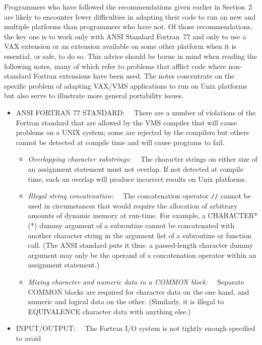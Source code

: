 \documentclass[twoside,11pt]{article}
\renewcommand{\_}{{\tt\char'137}}
\begin{document}
Programmers who have followed the recommendations given earlier in
Section~2 are likely to encounter fewer difficulties in adapting their
code to run on new and multiple platforms than programmers who have
not.  Of those recommendations, the key one is to work only with
ANSI Standard Fortran~77 and only to use a VAX extension
or an extension available on some other platform when it is essential,
or safe, to do so.  This advice
should be borne in mind when reading the following
notes, many of which refer to problems that
afflict code where non-standard Fortran extensions have
been used.  The notes concentrate on the specific problem of adapting
VAX/VMS applications to run on Unix platforms but also serve to
illustrate more general portability issues.
\begin{itemize}
 \item ANSI FORTRAN 77 STANDARD:~~
  There are a number of violations of the Fortran standard that are
  allowed by the VMS compiler that will cause problems on a UNIX system;
  some are rejected by the compilers but others cannot be detected at
  compile time and will cause programs to fail.
  \begin{itemize}
   \item {\it Overlapping character substrings:~~}
    The character strings on either size of an assignment
    statement must not overlap.  If not detected at compile
    time, such an overlap will produce incorrect results on
    Unix platforms.
   \item {\it Illegal string concatenation:~~}
    The concatenation operator \verb|//| cannot be used in
    circumstances that would require the allocation of arbitrary
    amounts of dynamic memory at run-time.
    For example, a CHARACTER*(*)
    dummy argument of a subroutine cannot be concatenated
    with another character string in the argument list of a subroutine or
    function call.  (The ANSI standard puts it thus:  a passed-length
    character dummy argument may only be the operand of a concatenation
    operator within an assignment statement.)
   \item {\it Mixing character and numeric data in a COMMON block:~~}
    Separate COMMON blocks are required for character data on the one
    hand, and numeric and logical data on the other.  (Similarly,
    it is illegal to EQUIVALENCE character data with anything else.)
  \end{itemize}
 \item INPUT/OUTPUT:~~
  The Fortran I/O system is not tightly enough specified to avoid

\end{itemize}
\end{document}
